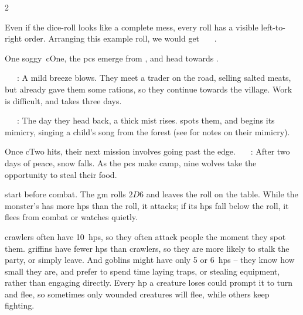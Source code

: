 \begin{multicols}{2}
{\begin{minipage}{.2\linewidth}
    \qquad{}

    \hspace{3pt}
  \end{minipage}
  \begin{minipage}{.7\linewidth}
    \vspace{.5em}
    Even if the dice-roll looks like a complete mess, every roll has a visible left-to-right order.
    Arranging this example roll, we would get ~~~.
  \end{minipage}

  \begin{exampletext}

    One soggy~\gls{cOne}, the \glspl{pc} emerge from , and head towards .

    ~~~: A mild breeze blows.
    They meet a trader on the road, selling salted meats, but  already gave them some \glspl{ration}, so they continue towards the \gls{village}.
    Work is difficult, and takes three days.

    ~~~: The day they head back, a thick mist rises.
     spots them, and begins its mimicry, singing a child's song from the forest (see  for notes on their mimicry).

    Once \gls{cTwo} hits, their next mission involves going past the \gls{edge}.
    ~~~: After two days of peace, snow falls.
    As the \glspl{pc} make camp, nine wolves take the opportunity to steal their food.

  \end{exampletext}
}{
  \toggletrue{genExamples}
  \allEncounterTables
}

start before combat.
The \gls{gm} rolls $2D6$ and leaves the roll on the table.
While the \gls{monster}'s has more \glspl{hp} than the roll, it attacks;
if its \glspl{hp} fall below the roll, it flees from combat or watches quietly.

\Glspl{crawler} often have 10~\glspl{hp}, so they often attack people the moment they spot them.
\Glspl{griffin} have fewer \glspl{hp} than \glspl{crawler}, so they are more likely to stalk the party, or simply leave.
And goblins might have only 5 or 6~\glspl{hp} -- they know how small they are, and prefer to spend time laying traps, or stealing equipment, rather than engaging directly.
Every \gls{hp} a creature loses could prompt it to turn and flee, so sometimes only wounded creatures will flee, while others keep fighting.


\end{multicols}
